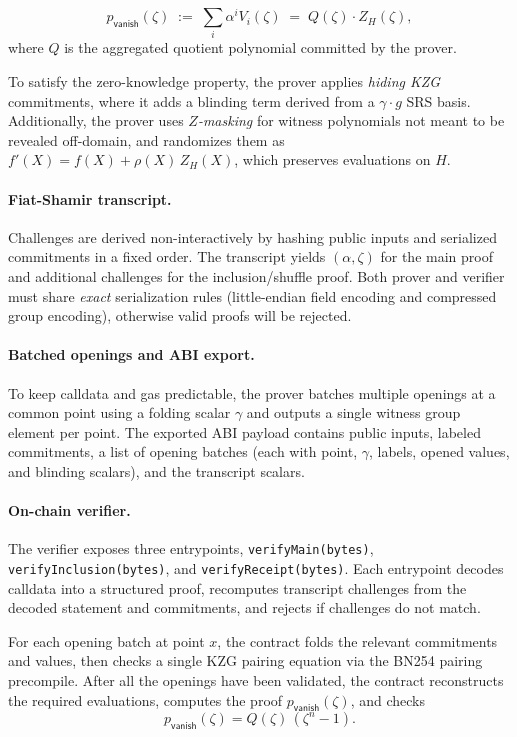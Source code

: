 \begin{equation*}
 p_{\textsf{vanish}}(\zeta)
  \;:=\;
  \sum_i \alpha^i V_i(\zeta)
  \;=\;
  Q(\zeta)\cdot Z_H(\zeta),
\end{equation*}
where $Q$ is the aggregated quotient polynomial committed by the prover.

To satisfy the zero-knowledge property, the prover applies \emph{hiding KZG} commitments, where it
adds a blinding term derived from a $\gamma\cdot g$ SRS basis. Additionally, the prover uses 
\emph{$Z$-masking} for witness polynomials not meant to be revealed off-domain, and randomizes them as
$f'(X)=f(X)+\rho(X)\,Z_H(X)$, which preserves evaluations on $H$.

\paragraph{Fiat-Shamir transcript.}
Challenges are derived non-interactively by hashing public inputs and serialized
commitments in a fixed order. The transcript yields $(\alpha,\zeta)$ for the main
proof and additional challenges for the inclusion/shuffle proof.
Both prover and verifier must share \emph{exact} serialization rules
(little-endian field encoding and compressed group encoding), otherwise valid
proofs will be rejected.

\paragraph{Batched openings and ABI export.}
To keep calldata and gas predictable, the prover batches multiple openings at a
common point using a folding scalar $\gamma$ and outputs a single witness group
element per point. The exported ABI payload contains public inputs, labeled
commitments, a list of opening batches (each with point, $\gamma$, labels, opened
values, and blinding scalars), and the transcript scalars.

\paragraph{On-chain verifier.}
The verifier exposes three entrypoints, \texttt{verifyMain(bytes)}, \texttt{verifyInclusion(bytes)}, and \texttt{verifyReceipt(bytes)}.
Each entrypoint decodes calldata into a structured proof, recomputes transcript
challenges from the decoded statement and commitments, and rejects if challenges
do not match.

For each opening batch at point $x$, the contract folds the relevant commitments
and values, then checks a single KZG pairing equation via the BN254 pairing
precompile. After all the openings have been validated, the contract reconstructs the required
evaluations, computes the proof $p_{\textsf{vanish}}(\zeta)$, and checks
\begin{equation*}
  p_{\textsf{vanish}}(\zeta)=Q(\zeta)\,(\zeta^n-1).
\end{equation*}

